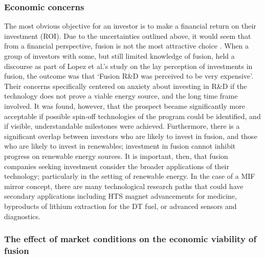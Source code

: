 \subsubsection{Economic concerns}

The most obvious objective for an investor is to make a financial return on their investment (ROI). Due to the uncertainties outlined above, it would seem that from a financial perspective, fusion is not the most attractive choice \cite{prades2008lay}. When a group of investors with some, but still limited knowledge of fusion, held a discourse as part of Lopez et al.’s study on the lay perception of investments in fusion, the outcome was that ‘Fusion R\&D was perceived to be very expensive’. Their concerns specifically centered on anxiety about investing in R\&D if the technology does not prove a viable energy source, and the long time frame involved. It was found, however, that the prospect became significantly more acceptable if possible spin-off technologies of the program could be identified, and if visible, understandable milestones were achieved. Furthermore, there is a significant overlap between investors who are likely to invest in fusion, and those who are likely to invest in renewables; investment in fusion cannot inhibit progress on renewable energy sources. It is important, then, that fusion companies seeking investment consider the broader applications of their technology; particularly in the setting of renewable energy. In the case of a MIF mirror concept, there are many technological research paths that could have secondary applications including HTS magnet advancements for medicine, byproducts of lithium extraction for the DT fuel, or advanced sensors and diagnostics.

\subsubsection{The effect of market conditions on the economic viability of fusion}

